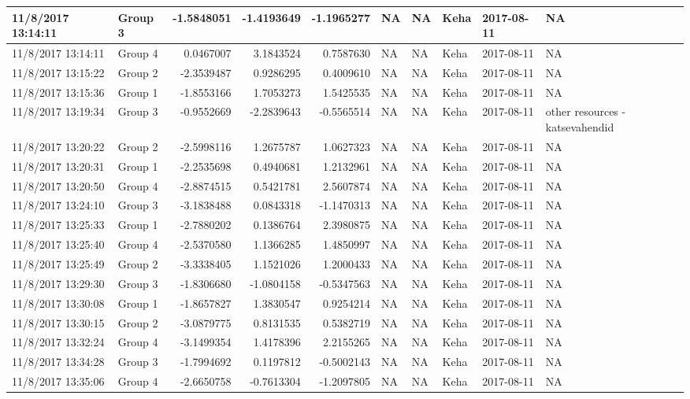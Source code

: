 \documentclass[]{article}
\begin{document}
\begin{tabular}{l|l|r|r|r|l|l|l|l|l}
\hline
11/8/2017 13:14:11 & Group 3 & -1.5848051 & -1.4193649 & -1.1965277 & NA & NA & Keha & 2017-08-11 & NA\\
\hline
11/8/2017 13:14:11 & Group 4 & 0.0467007 & 3.1843524 & 0.7587630 & NA & NA & Keha & 2017-08-11 & NA\\
\hline
11/8/2017 13:15:22 & Group 2 & -2.3539487 & 0.9286295 & 0.4009610 & NA & NA & Keha & 2017-08-11 & NA\\
\hline
11/8/2017 13:15:36 & Group 1 & -1.8553166 & 1.7053273 & 1.5425535 & NA & NA & Keha & 2017-08-11 & NA\\
\hline
11/8/2017 13:19:34 & Group 3 & -0.9552669 & -2.2839643 & -0.5565514 & NA & NA & Keha & 2017-08-11 & other resources - katsevahendid\\
\hline
11/8/2017 13:20:22 & Group 2 & -2.5998116 & 1.2675787 & 1.0627323 & NA & NA & Keha & 2017-08-11 & NA\\
\hline
11/8/2017 13:20:31 & Group 1 & -2.2535698 & 0.4940681 & 1.2132961 & NA & NA & Keha & 2017-08-11 & NA\\
\hline
11/8/2017 13:20:50 & Group 4 & -2.8874515 & 0.5421781 & 2.5607874 & NA & NA & Keha & 2017-08-11 & NA\\
\hline
11/8/2017 13:24:10 & Group 3 & -3.1838488 & 0.0843318 & -1.1470313 & NA & NA & Keha & 2017-08-11 & NA\\
\hline
11/8/2017 13:25:33 & Group 1 & -2.7880202 & 0.1386764 & 2.3980875 & NA & NA & Keha & 2017-08-11 & NA\\
\hline
11/8/2017 13:25:40 & Group 4 & -2.5370580 & 1.1366285 & 1.4850997 & NA & NA & Keha & 2017-08-11 & NA\\
\hline
11/8/2017 13:25:49 & Group 2 & -3.3338405 & 1.1521026 & 1.2000433 & NA & NA & Keha & 2017-08-11 & NA\\
\hline
11/8/2017 13:29:30 & Group 3 & -1.8306680 & -1.0804158 & -0.5347563 & NA & NA & Keha & 2017-08-11 & NA\\
\hline
11/8/2017 13:30:08 & Group 1 & -1.8657827 & 1.3830547 & 0.9254214 & NA & NA & Keha & 2017-08-11 & NA\\
\hline
11/8/2017 13:30:15 & Group 2 & -3.0879775 & 0.8131535 & 0.5382719 & NA & NA & Keha & 2017-08-11 & NA\\
\hline
11/8/2017 13:32:24 & Group 4 & -3.1499354 & 1.4178396 & 2.2155265 & NA & NA & Keha & 2017-08-11 & NA\\
\hline
11/8/2017 13:34:28 & Group 3 & -1.7994692 & 0.1197812 & -0.5002143 & NA & NA & Keha & 2017-08-11 & NA\\
\hline
11/8/2017 13:35:06 & Group 4 & -2.6650758 & -0.7613304 & -1.2097805 & NA & NA & Keha & 2017-08-11 & NA\\

\end{tabular}
\end{document}
